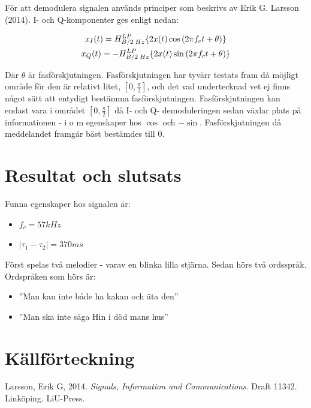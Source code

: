 \documentclass[10pt]{article}
\begin{document}
För att demodulera signalen används principer som beskrivs av Erik G. Larsson (2014). I- och Q-komponenter ges enligt nedan: 

\begin{gather}
x_{I}(t) = \Large{H}_{B/2\;Hz}^{LP}\{2x(t)\cos{(2{\pi}f_{c}t + \theta)}\} \\
x_{Q}(t) = -\Large{H}_{B/2\;Hz}^{LP}\{2x(t)\sin{(2{\pi}f_{c}t + \theta)}\}
\label{equ:iq}
\end{gather}

Där $\theta$ är fasförskjutningen. Fasförskjutningen har tyvärr testats fram då möjligt område för den är relativt litet, $[0,\frac{\pi}{2}]$, och det vad undertecknad vet ej finns något sätt att entydigt bestämma fasförskjutningen. Fasförskjutningen kan endast vara i området $[0,\frac{\pi}{2}]$ då I- och Q- demoduleringen sedan växlar plats på informationen - i o m egenskaper hos $\cos$ och $-\sin$. Fasförskjutningen då meddelandet framgår bäst bestämdes till $0$.



\newpage
\section{Resultat och slutsats}

Funna egenskaper hos signalen är: 

\begin{itemize}
	\item $f_c = 57kHz$
	\item $|\tau_1 - \tau_2| = 370ms$
\end{itemize}

Först spelas två melodier - varav en blinka lilla stjärna. Sedan hörs två ordsspråk. Ordspråken som hörs är: 

\begin{itemize}
	\item ''Man kan inte både ha kakan och äta den''
	\item ''Man ska inte säga Hin i död mans hus''
\end{itemize}


\section{Källförteckning}

Larsson, Erik G, 2014. \textit{Signals, Information and Communications}. Draft 11342. Linköping. LiU-Press.
\end{document}
